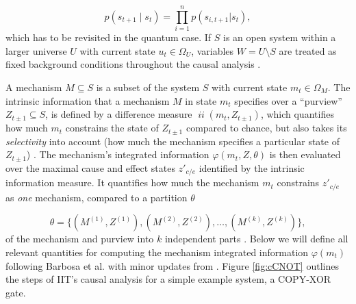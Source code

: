 \documentclass[preprints, article, accept, pdftex, moreauthors, letterpaper]{Definitions/mdpi}
\renewcommand{\=}[1]{\stackrel{#1}{=}} %
\newcommand{\p}{\theta} %
\DeclareMathOperator{\ii}{\mathit{ii}}
\renewcommand{\*}{\otimes}%
\begin{document}
\begin{equation}
\label{eq:condind}
p(s_{t+1}\mid s_t) = \prod_{i=1}^n p(s_{i,t+1}|s_t),
\end{equation}
%
which has to be revisited in the quantum case. If $S$ is an open system within a larger universe $U$ with current state $u_t \in \Omega_U$, variables $W = U \setminus S$ are treated as fixed background conditions throughout the causal analysis \cite{Oizumi2014, Barbosa2021}.  

A mechanism $M \subseteq S$ is a subset of the system $S$ with current state $m_t \in \Omega_M$. 
The intrinsic information that a mechanism $M$ in state $m_t$ specifies over a ``purview'' $Z_{t\pm1} \subseteq S$, is defined by a difference measure $\ii(m_t, Z_{t\pm1})$, which quantifies how much $m_t$ constrains the state of $Z_{t\pm1}$ compared to chance, but also takes its \textit{selectivity} into account (how much the mechanism specifies a particular state of $Z_{t\pm1}$) \cite{Barbosa2021, Albantakis2022_4_0}. 
The mechanism's integrated information $\varphi(m_t, Z, \theta)$ is then evaluated over the maximal cause and effect states $z'_{c/e}$ identified by the intrinsic information measure. It quantifies how much the mechanism $m_t$ constrains $z'_{c/e}$ as \textit{one} mechanism, compared to a partition $\p$ 

\begin{equation}
\label{eq:parts}
\p = \{ (M^{(1)}, Z^{(1)}), (M^{(2)}, Z^{(2)}), \ldots, (M^{(k)}, Z^{(k)}) \},
\end{equation}
%
of the mechanism and purview into $k$ independent parts \cite{Oizumi2014, Barbosa2021}. 
Below we will define all relevant quantities for computing the mechanism integrated information $\varphi(m_t)$ following Barbosa et al. \cite{Barbosa2021} with minor updates from \cite{Albantakis2022_4_0}. Figure \ref{fig:cCNOT} outlines the steps of IIT's causal analysis for a simple example system, a COPY-XOR gate.
\end{document}
